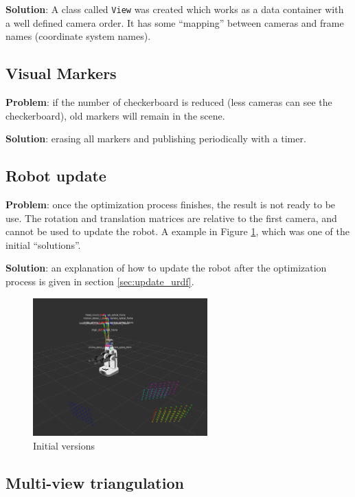 \noindent
\textbf{Solution}: A class called \texttt{View} was created which works as a data container with a well defined camera order. It has some ``mapping'' between cameras and frame names (coordinate system names).

\subsection{Visual Markers}

\textbf{Problem}: if the number of checkerboard is reduced (less cameras can see the checkerboard), old markers will remain in the scene.

\noindent
\textbf{Solution}: erasing all markers and publishing periodically with a timer.

\subsection{Robot update}

\textbf{Problem}: once the optimization process finishes, the result is not ready to be use. The rotation and translation matrices are relative to the first camera, and cannot be used to update the robot. A example in Figure \ref{fig:optimization_failer}, which was one of the initial ``solutions''.

\noindent
\textbf{Solution}: an explanation of how to update the robot after the optimization process is given in section \ref{sec:update_urdf}.

\begin{figure}[!htbp]
 \centering
 \includegraphics[width=0.6\textwidth]{images/screenshots/optimization_failer02_2.png}
 \caption{Initial versions}
 \label{fig:optimization_failer}
\end{figure}


\newpage
\subsection{Multi-view triangulation}

